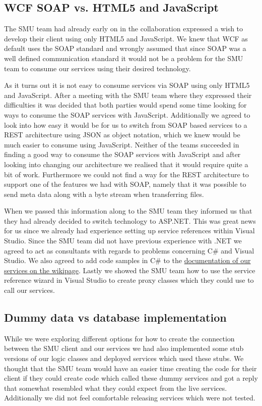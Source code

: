 \documentclass[../report.tex]{subfiles}
\begin{document}
\subsection{WCF SOAP vs. HTML5 and JavaScript}
The SMU team had already early on in the collaboration expressed a wish to develop their client using only HTML5 and JavaScript. 
We knew that WCF as default uses the SOAP standard and wrongly assumed that since SOAP was a well defined communication standard it would not be a problem for the SMU team to consume our services using their desired technology.

As it turns out it is not easy to consume services via SOAP using only HTML5 and JavaScript.
After a meeting with the SMU team where they expressed their difficulties it was decided that both parties would spend some time looking for ways to consume the SOAP services with JavaScript.
Additionally we agreed to look into how easy it would be for us to switch from SOAP based services to a REST architecture using JSON as object notation, which we knew would be much easier to consume using JavaScript.
Neither of the teams succeeded in finding a good way to consume the SOAP services with JavaScript and after looking into changing our architecture we realised that it would require quite a bit of work. 
Furthermore we could not find a way for the REST architecture to support one of the features we had with SOAP, namely that it was possible to send meta data along with a byte stream when transferring files.

When we passed this information along to the SMU team they informed us that they had already decided to switch technology to ASP.NET.
This was great news for us since we already had experience setting up service references within Visual Studio.
Since the SMU team did not have previous experience with .NET we agreed to act as consultants with regards to problems concerning C\# and Visual Studio.
We also agreed to add code samples in C\# to the \href{https://wiki.smu.edu.sg/is411/Team8\_Services\_Documentation}{documentation of our services on the wikipage}.
Lastly we showed the SMU team how to use the service reference wizard in Visual Studio to create proxy classes which they could use to call our services.

\subsection{Dummy data vs database implementation}
While we were exploring different options for how to create the connection between the SMU client and our services we had also implemented some stub versions of our logic classes and deployed services which used these stubs.
We thought that the SMU team would have an easier time creating the code for their client if they could create code which called these dummy services and got a reply that somewhat resembled what they could expect from the live services.
Additionally we did not feel comfortable releasing services which were not tested.
\end{document}
